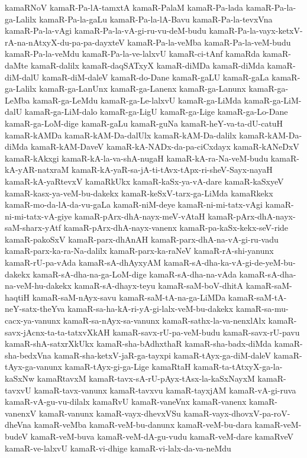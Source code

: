 {kamaRNoV
kamaR-Pa-lA-tamxtA
kamaR-PalaM
kamaR-Pa-lada
kamaR-Pa-la-ga-Lalilx
kamaR-Pa-la-gaLu
kamaR-Pa-la-lA-Bavu
kamaR-Pa-la-tevxVna
kamaR-Pa-la-vAgi
kamaR-Pa-la-vA-gi-ru-vu-deM-budu
kamaR-Pa-la-vayx-ketxV-rA-na-nAtxyX-du-pa-pa-dayxteV
kamaR-Pa-la-veMba
kamaR-Pa-la-veM-budu
kamaR-Pa-la-veMdu
kamaR-Pa-la-ve-lalxvU
kamaR-ci-tAnf
kamaRda
kamaR-daMte
kamaR-dalilx
kamaR-daqSATxyX
kamaR-diMDa
kamaR-diMda
kamaR-diM-dalU
kamaR-diM-daleV
kamaR-do-Dane
kamaR-gaLU
kamaR-gaLa
kamaR-ga-Lalilx
kamaR-ga-LanUnx
kamaR-ga-Lanenx
kamaR-ga-Lanunx
kamaR-ga-LeMba
kamaR-ga-LeMdu
kamaR-ga-Le-lalxvU
kamaR-ga-LiMda
kamaR-ga-LiM-dalU
kamaR-ga-LiM-dalo
kamaR-ga-LigU
kamaR-ga-Lige
kamaR-ga-Lo-Dane
kamaR-ga-LoM-dige
kamaR-gaLu
kamaR-guNa
kamaR-heY-va-ta-dU-catuH
kamaR-kAMDa
kamaR-kAM-Da-dalUlx
kamaR-kAM-Da-dalilx
kamaR-kAM-Da-diMda
kamaR-kAM-DaveV
kamaR-kA-NADx-da-pa-ciCxdayx
kamaR-kANeDxV
kamaR-kAkxgi
kamaR-kA-la-va-shA-nugaH
kamaR-kA-ra-Na-veM-budu
kamaR-kA-yAR-natxraM
kamaR-kA-yaR-sa-jA-ti-tAvx-tApx-ri-sheV-Sayx-nayaH
kamaR-kA-yaRtevxV
kamaRkUkx
kamaR-kaSx-ya-vA-dare
kamaR-kaSxyeV
kamaR-kasx-ya-veM-bu-dakekx
kamaR-keSxV-tarx-ga-LiMda
kamaRkekx
kamaR-mo-da-lA-da-vu-gaLa
kamaR-niM-deye
kamaR-ni-mi-tatx-vAgi
kamaR-ni-mi-tatx-vA-giye
kamaR-pArx-dhA-nayx-meV-vAtaH
kamaR-pArx-dhA-nayx-saM-sharx-yAtf
kamaR-pArx-dhA-nayx-vanenx
kamaR-pa-kaSx-kekx-seV-ride
kamaR-pakoSxV
kamaR-parx-dhAnAH
kamaR-parx-dhA-na-vA-gi-ru-vadu
kamaR-parx-ka-ra-Na-dalilx
kamaR-parx-ka-raNeV
kamaR-rA-shi-yanunx
kamaR-rU-pa-vAda
kamaR-sA-dhAyxyAM
kamaR-sA-dha-ka-vA-gi-de-yeM-bu-dakekx
kamaR-sA-dha-na-ga-LoM-dige
kamaR-sA-dha-na-vAda
kamaR-sA-dha-na-veM-hu-dakekx
kamaR-sA-dhayx-teyu
kamaR-saM-boV-dhitA
kamaR-saM-haqtiH
kamaR-saM-nAyx-savu
kamaR-saM-tA-na-ga-LiMDa
kamaR-saM-tA-neY-satx-theYva
kamaR-sa-ha-kA-ri-yA-gi-lalx-veM-bu-dakekx
kamaR-sa-mu-cacx-ya-vanunx
kamaR-sa-nAyx-sa-vanunx
kamaR-sathx-la-va-nenxlAlx
kamaR-savx-jAcnx-ta-ta-tatxvXkAH
kamaR-savx-rU-pa-veM-budu
kamaR-savx-rU-pavu
kamaR-shA-satxrXkUkx
kamaR-sha-bAdhxthaR
kamaR-sha-badx-diMda
kamaR-sha-bedxVna
kamaR-sha-ketxV-jaR-ga-tayxpi
kamaR-tAyx-ga-diM-daleV
kamaR-tAyx-ga-vanunx
kamaR-tAyx-gi-ga-Lige
kamaRtaH
kamaR-ta-tAtxyX-ga-la-kaSxNw
kamaRtavxM
kamaR-tavx-sA-rU-pAyx-tAsx-la-kaSxNayxM
kamaR-tavxvU
kamaR-tavx-vanunx
kamaR-tavxvu
kamaR-tayxjAM
kamaR-vA-gi-ruva
kamaR-vA-gu-vu-dilalx
kamaRvU
kamaR-vaneVnx
kamaR-vanenx
kamaR-vanenxV
kamaR-vanunx
kamaR-vayx-dhevxVSu
kamaR-vayx-dhovxV-pa-roV-dheVna
kamaR-veMba
kamaR-veM-bu-danunx
kamaR-veM-bu-dara
kamaR-veM-budeV
kamaR-veM-buva
kamaR-veM-dA-gu-vudu
kamaR-veM-dare
kamaRveV
kamaR-ve-lalxvU
kamaR-vi-dhige
kamaR-vi-lalx-da-va-neMdu
}
